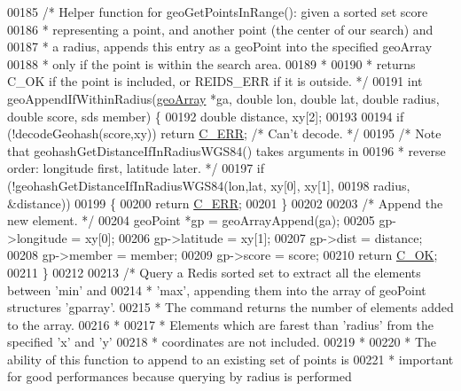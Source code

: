 \begin{DoxyCode}
{{00185 \textcolor{comment}{/* Helper function for geoGetPointsInRange(): given a sorted set score}
00186 \textcolor{comment}{ * representing a point, and another point (the center of our search) and}
00187 \textcolor{comment}{ * a radius, appends this entry as a geoPoint into the specified geoArray}
00188 \textcolor{comment}{ * only if the point is within the search area.}
00189 \textcolor{comment}{ *}
00190 \textcolor{comment}{ * returns C\_OK if the point is included, or REIDS\_ERR if it is outside. */}
00191 \textcolor{keywordtype}{int} geoAppendIfWithinRadius(\hyperlink{structgeoArray}{geoArray} *ga, \textcolor{keywordtype}{double} lon, \textcolor{keywordtype}{double} lat, \textcolor{keywordtype}{double} radius, \textcolor{keywordtype}{double} score,
       sds member) \{
00192     \textcolor{keywordtype}{double} distance, xy[2];
00193 
00194     \textcolor{keywordflow}{if} (!decodeGeohash(score,xy)) \textcolor{keywordflow}{return} \hyperlink{server_8h_af98ac28d5f4d23d7ed5985188e6fb7d1}{C\_ERR}; \textcolor{comment}{/* Can't decode. */}
00195     \textcolor{comment}{/* Note that geohashGetDistanceIfInRadiusWGS84() takes arguments in}
00196 \textcolor{comment}{     * reverse order: longitude first, latitude later. */}
00197     \textcolor{keywordflow}{if} (!geohashGetDistanceIfInRadiusWGS84(lon,lat, xy[0], xy[1],
00198                                            radius, &distance))
00199     \{
00200         \textcolor{keywordflow}{return} \hyperlink{server_8h_af98ac28d5f4d23d7ed5985188e6fb7d1}{C\_ERR};
00201     \}
00202 
00203     \textcolor{comment}{/* Append the new element. */}
00204     geoPoint *gp = geoArrayAppend(ga);
00205     gp->longitude = xy[0];
00206     gp->latitude = xy[1];
00207     gp->dist = distance;
00208     gp->member = member;
00209     gp->score = score;
00210     \textcolor{keywordflow}{return} \hyperlink{server_8h_a303769ef1065076e68731584e758d3e1}{C\_OK};
00211 \}
00212 
00213 \textcolor{comment}{/* Query a Redis sorted set to extract all the elements between 'min' and}
00214 \textcolor{comment}{ * 'max', appending them into the array of geoPoint structures 'gparray'.}
00215 \textcolor{comment}{ * The command returns the number of elements added to the array.}
00216 \textcolor{comment}{ *}
00217 \textcolor{comment}{ * Elements which are farest than 'radius' from the specified 'x' and 'y'}
00218 \textcolor{comment}{ * coordinates are not included.}
00219 \textcolor{comment}{ *}
00220 \textcolor{comment}{ * The ability of this function to append to an existing set of points is}
00221 \textcolor{comment}{ * important for good performances because querying by radius is performed}
}}
\end{DoxyCode}

